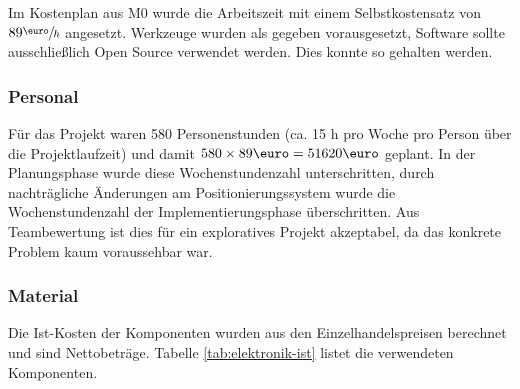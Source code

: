 
Im Kostenplan aus M0 wurde die Arbeitszeit mit einem Selbstkostensatz von $89 \sfrac{\text{\euro}}{h}$ angesetzt. Werkzeuge wurden als gegeben vorausgesetzt, Software sollte ausschließlich Open Source verwendet werden. Dies konnte so gehalten werden. 

\subsubsection{Personal}

Für das Projekt waren 580 Personenstunden (ca. 15 h pro Woche pro Person über die Projektlaufzeit) und damit $580 \times 89  \text{\euro} = 51620 \text{\euro}$ geplant. In der Planungsphase wurde diese Wochenstundenzahl unterschritten, durch nachträgliche Änderungen am Positionierungssystem wurde die Wochenstundenzahl der Implementierungsphase überschritten. Aus Teambewertung ist dies für ein exploratives Projekt akzeptabel, da das konkrete Problem kaum voraussehbar war. 


\subsubsection{Material}

Die Ist-Kosten der Komponenten wurden aus den Einzelhandelspreisen berechnet und sind Nettobeträge. Tabelle \ref{tab:elektronik-ist} listet die verwendeten Komponenten.

